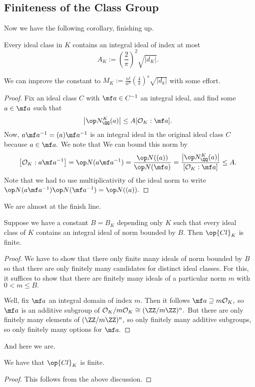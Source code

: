 \subsection{Finiteness of the Class Group}
Now we have the following corollary, finishing up.
\begin{corollary}
    Every ideal class in $K$ contains an integral ideal of index at most
    \[A_K:=\left(\frac2\pi\right)^2\sqrt{|d_K|}.\]
\end{corollary}
\begin{remark}
    We can improve the constant to $M_K:=\frac{n!}{n^n}\left(\frac4\pi\right)^s\sqrt{|d_k|}$ with some effort.
\end{remark}
\begin{proof}
    Fix an ideal class $C$ with $\mf a\in C^{-1}$ an integral ideal, and find some $a\in\mf a$ such that
    \[\left|\op N_\QQ^K(a)\right|\le A[\mathcal O_K:\mf a].\]
    Now, $a\mf a^{-1}=(a)\mf a^{-1}$ is an integral ideal in the original ideal class $C$ because $a\in\mf a.$ We note that We can bound this norm by
    \[\left[\mathcal O_K:a\mf a^{-1}\right]=\op N(a\mf a^{-1})=\frac{\op N((a))}{\op N(\mf a)}=\frac{\left|\op N_\QQ^K(a)\right|}{[\mathcal O_K:\mf a]}\le A.\]
    Note that we had to use multiplicativity of the ideal norm to write $\op N(a\mf a^{-1})\op N(\mf a^{-1})=\op N((a)).$
\end{proof}
We are almost at the finish line.
\begin{lemma}
    Suppose we have a constant $B=B_K$ depending only $K$ such that every ideal class of $K$ contains an integral ideal of norm bounded by $B.$ Then $\op{Cl}_K$ is finite.
\end{lemma}
\begin{proof}
    We have to show that there only finite many ideals of norm bounded by $B$ so that there are only finitely many candidates for distinct ideal classes. For this, it suffices to show that there are finitely many ideals of a particular norm $m$ with $0<m\le B.$

    Well, fix $\mf a$ an integral domain of index $m.$ Then it follows $\mf a\supseteq m\mathcal O_K,$ so $\mf a$ is an additive subgroup of $\mathcal O_K/m\mathcal O_K\cong(\ZZ/m\ZZ)^n.$ But there are only finitely many elements of $(\ZZ/m\ZZ)^n,$ so only finitely many additive subgroups, so only finitely many options for $\mf a.$
\end{proof}
And here we are.
\begin{theorem}
    We have that $\op{Cl}_K$ is finite.
\end{theorem}
\begin{proof}
    This follows from the above discussion.
\end{proof}

